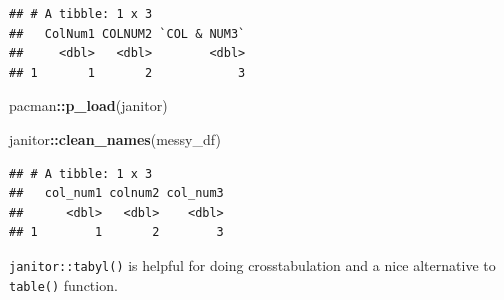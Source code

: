 \documentclass[
]{book}
\newenvironment{Shaded}{\begin{snugshade}}{\end{snugshade}}
\newcommand{\CommentTok}[1]{\textcolor[rgb]{0.56,0.35,0.01}{\textit{#1}}}
\newcommand{\FunctionTok}[1]{\textcolor[rgb]{0.13,0.29,0.53}{\textbf{#1}}}
\newcommand{\NormalTok}[1]{#1}
\newcommand{\SpecialCharTok}[1]{\textcolor[rgb]{0.81,0.36,0.00}{\textbf{#1}}}
\begin{document}
\begin{verbatim}
## # A tibble: 1 x 3
##   ColNum1 COLNUM2 `COL & NUM3`
##     <dbl>   <dbl>        <dbl>
## 1       1       2            3
\end{verbatim}

\begin{Shaded}
\begin{Highlighting}[]
\NormalTok{pacman}\SpecialCharTok{::}\FunctionTok{p\_load}\NormalTok{(janitor)}

\NormalTok{janitor}\SpecialCharTok{::}\FunctionTok{clean\_names}\NormalTok{(messy\_df)}
\end{Highlighting}
\end{Shaded}

\begin{verbatim}
## # A tibble: 1 x 3
##   col_num1 colnum2 col_num3
##      <dbl>   <dbl>    <dbl>
## 1        1       2        3
\end{verbatim}

\texttt{janitor::tabyl()} is helpful for doing crosstabulation and a nice alternative to \texttt{table()} function.

\begin{Shaded}
\end{Shaded}
\end{document}
